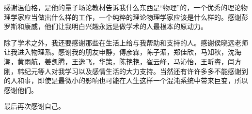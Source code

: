 \documentclass[oneside]{fduthesis}
\begin{document}
感谢温伯格，是他的量子场论教材告诉我什么东西是“物理”的，一个优秀的理论物理学家应当做出什么样的工作，一个纯粹的理论物理学家应该是什么样的。感谢彭罗斯和康威，他们让我明白兴趣永远是做学术的人最根本的原动力。



除了学术之外，我还要感谢那些在生活上给与我帮助和支持的人。感谢侯晓远老师让我进入物理系。感谢我的朋友申静，傅彦霖，陈子湄，郑佳欣，马知秋，沈海潮，黄雨航，姜凯腾，王逸飞，华策，陈艳艳，崔云峰，马沁怡，王昕睿，闫方刚，韩纪元等人对我学习以及感情生活的大力支持。当然还有许许多多不能感谢到的人和事，即使是最微小的影响也可能在人生这样一个混沌系统中带来巨变，所以感谢他们。



最后再次感谢自己。
	
\end{document}

